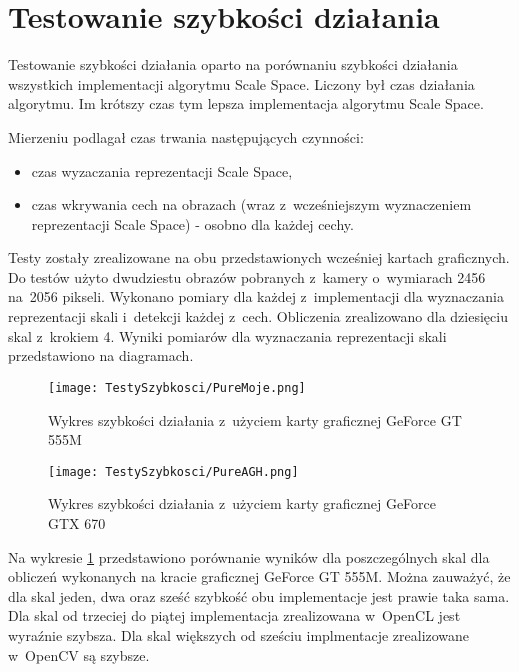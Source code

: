 \section{Testowanie szybkości działania}
\label{sec:testSzybkosci}

Testowanie szybkości działania oparto na porównaniu szybkości działania wszystkich implementacji algorytmu Scale Space. Liczony był czas działania algorytmu. Im krótszy czas tym lepsza implementacja algorytmu Scale Space.

Mierzeniu podlagał czas trwania następujących czynności:
\begin{itemize}
\item czas wyzaczania reprezentacji Scale Space,
\item czas wkrywania cech na obrazach (wraz z~wcześniejszym wyznaczeniem reprezentacji Scale Space) - osobno dla każdej cechy.
\end{itemize}

Testy zostały zrealizowane na obu przedstawionych wcześniej kartach graficznych. Do testów użyto dwudziestu obrazów pobranych z~kamery o~wymiarach 2456 na~2056 pikseli. Wykonano pomiary dla każdej z~implementacji dla wyznaczania reprezentacji skali i~detekcji każdej z~cech. Obliczenia zrealizowano dla dziesięciu skal z~krokiem 4. Wyniki pomiarów dla wyznaczania reprezentacji skali przedstawiono na diagramach.

\begin{figure}[h]
\begin{center}
\texttt{[image: TestySzybkosci/PureMoje.png]}
\end{center}
\caption{Wykres szybkości działania z~użyciem karty graficznej GeForce GT 555M}
\label{fig:pureSzybkoscMoje}
\end{figure}

\begin{figure}[h]
\begin{center}
\texttt{[image: TestySzybkosci/PureAGH.png]}
\end{center}
\caption{Wykres szybkości działania z~użyciem karty graficznej GeForce GTX 670}
\label{fig:pureSzybkoscAGH}
\end{figure}

Na wykresie \ref{fig:pureSzybkoscMoje} przedstawiono porównanie wyników dla poszczególnych skal dla obliczeń wykonanych na kracie graficznej GeForce GT 555M. Można zauważyć, że dla skal jeden, dwa oraz sześć szybkość obu implementacje jest prawie taka sama. Dla skal od trzeciej do piątej implementacja zrealizowana w~OpenCL jest wyraźnie szybsza. Dla skal większych od sześciu implmentacje zrealizowane w~OpenCV są szybsze.

